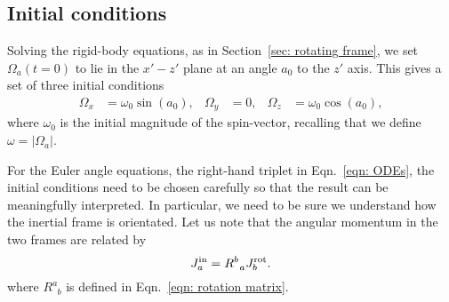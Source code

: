 \documentclass[../full_thesis/full_thesis.tex]{subfiles}
\begin{document}
\subsection{Initial conditions}
\label{sec: initial conditions}

Solving the rigid-body equations, as in Section~\ref{sec:
rotating frame}, we set
$\Omega_a(t=0)$ to lie in the $x' - z'$ plane at an angle $a_{0}$ to the
$z'$ axis. This gives a set of three initial conditions
\begin{align}
\Omega_{x} & = \omega_{0}\sin(a_{0}), &
\Omega_{y} & = 0, &
\Omega_{z} & = \omega_{0}\cos(a_{0}),
\label{eqn: spin init}
\end{align}
where $\omega_0$ is the initial magnitude of the spin-vector, recalling that
we define $\omega = |\Omega_a|$.

For the Euler angle equations, the right-hand triplet in Eqn.~\eqref{eqn:
ODEs}, the initial conditions need to be chosen carefully so that the result
can be meaningfully interpreted. In particular, we need to be sure we understand
how the inertial frame is orientated. Let us note that the angular
momentum in the two frames are related by
\begin{equation}
J^{\textrm{in}}_a = R^{b}_{\;\;a} J^{\textrm{rot}}_b .
\label{eqn: transform}
\end{equation}
where $R^{a}_{\;\;b}$ is defined in Eqn.~\eqref{eqn: rotation matrix}.
\end{document}
